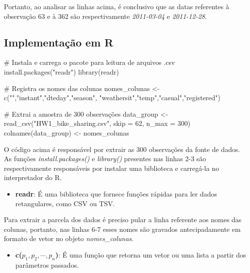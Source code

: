 \documentclass[a4paper, 12pt, titlepage]{article}
\begin{document}
Portanto, ao analisar as linhas acima, é conclusivo que as datas referentes à observação 63 e à 362 são respectivamente \textit{2011-03-04} e \textit{2011-12-28}. 
\newpage


\subsection*{Implementação em R}

\begin{rcode}[caption={Extração de amostra},breaklines=true, breakatwhitespace=true]
    # Instala e carrega o pacote para leitura de arquivos .csv
    install.packages("readr") 
    library(readr) 
    
    # Registra os nomes das colunas
    nomes_colunas <- c("","instant","dteday","season",
                        "weathersit","temp","casual","registered")
    
    # Extrai a amostra de 300 observações
    data_group <- read_csv("HW1_bike_sharing.csv", skip = 62, n_max = 300)
    colnames(data_group) <- nomes_colunas
\end{rcode}

O código acima é responsável por extrair as 300 observações da fonte de dados. As funções \textit{install.packages()} e \textit{library()} presentes nas linhas 2-3 são respectivamente responsáveis por instalar uma biblioteca e carregá-la no interpretador do R.

\begin{itemize}
    \item \textbf{readr}: É uma biblioteca que fornece funções rápidas para ler dados retangulares, como CSV ou TSV.
\end{itemize}

Para extrair a parcela dos dados é preciso pular a linha referente aos nomes das colunas, portanto, nas linhas 6-7 esses nomes são gravados antecipadamente em formato de vetor no objeto \textit{nomes\_colunas}.

\begin{itemize}
    \item \textbf{c($p_1, p_2, \cdots , p_{n}$)}: É uma função que retorna um vetor ou uma lista a partir dos parâmetros passados.
\end{itemize}
\end{document}
